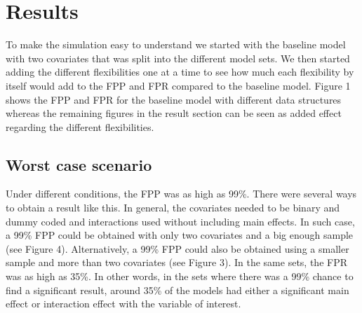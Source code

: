 \section{Results} 
To make the simulation easy to understand we started with the baseline model with two covariates that was split into the different model sets. We then started adding the different flexibilities one at a time to see how much each flexibility by itself would add to the FPP and FPR compared to the baseline model. Figure 1 shows the FPP and FPR for the baseline model with different data structures whereas the remaining figures in the result section can be seen as added effect regarding the different flexibilities. 
\subsection{Worst case scenario}
Under different conditions, the FPP was as high as 99\%. There were several ways to obtain a result like this. In general, the covariates needed to be binary and dummy coded and interactions used without including main effects. In such case, a 99\% FPP could be obtained with only two covariates and a big enough sample (see Figure 4). Alternatively, a 99\% FPP could also be obtained using a smaller sample and more than two covariates (see Figure 3). In the same sets, the FPR was as high as 35\%. In other words, in the sets where there was a 99\% chance to find a significant result, around 35\% of the models had either a significant main effect or interaction effect with the variable of interest. 

